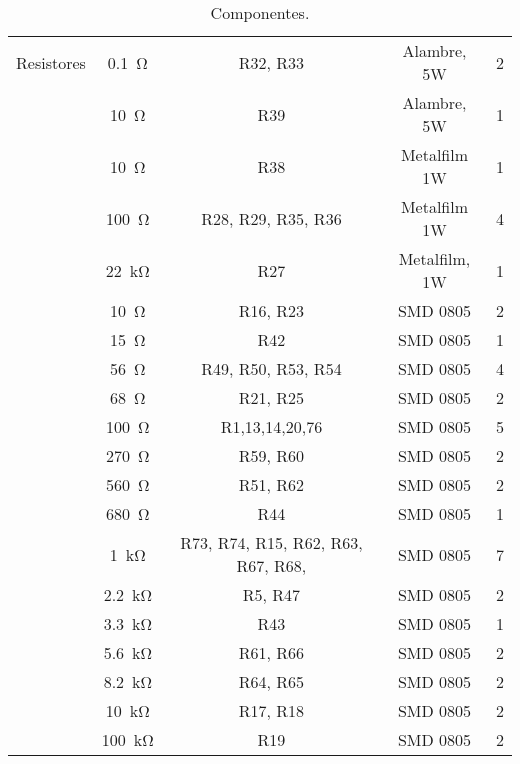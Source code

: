 \begin{table}
\begin{tabular}{ccccc}
		 \midrule
Resistores      & \SI{0.1}{\ohm} & R32, R33 & Alambre, 5W & 2 \\
		& \SI{10}{\ohm} & R39 & Alambre, 5W & 1 \\		
		& \SI{10}{\ohm} & R38 & Metalfilm 1W & 1 \\
		& \SI{100}{\ohm} & R28, R29, R35, R36 & Metalfilm 1W & 4 \\
		& \SI{22}{\kilo\ohm} & R27 & Metalfilm, 1W & 1 \\
		& \SI{10}{\ohm} & R16, R23 & SMD 0805 & 2 \\
		& \SI{15}{\ohm} & R42 & SMD 0805 & 1 \\
		& \SI{56}{\ohm} & R49, R50, R53, R54 & SMD 0805 & 4 \\
		& \SI{68}{\ohm} & R21, R25 & SMD 0805 & 2 \\
		& \SI{100}{\ohm} & R1,13,14,20,76 & SMD 0805 & 5 \\
		& \SI{270}{\ohm} & R59, R60 & SMD 0805 & 2 \\ 
		& \SI{560}{\ohm} & R51, R62 & SMD 0805 & 2 \\
		& \SI{680}{\ohm} & R44 & SMD 0805 & 1\\
		& \SI{1}{\kilo\ohm} & R73, R74, R15, R62, R63, R67, R68,  & SMD 0805 & 7 \\
		& \SI{2.2}{\kilo\ohm} & R5, R47 & SMD 0805 & 2 \\ 
		& \SI{3.3}{\kilo\ohm} & R43 & SMD 0805 & 1 \\
		& \SI{5.6}{\kilo\ohm} & R61, R66 & SMD 0805 & 2 \\
		& \SI{8.2}{\kilo\ohm} & R64, R65 & SMD 0805 & 2 \\
		& \SI{10}{\kilo\ohm} & R17, R18 & SMD 0805 & 2 \\
		& \SI{100}{\kilo\ohm} & R19 & SMD 0805 & 2 \\
\bottomrule
	\end{tabular}
	\caption{Componentes.}
	\label{tab.componentes}
\end{table}
